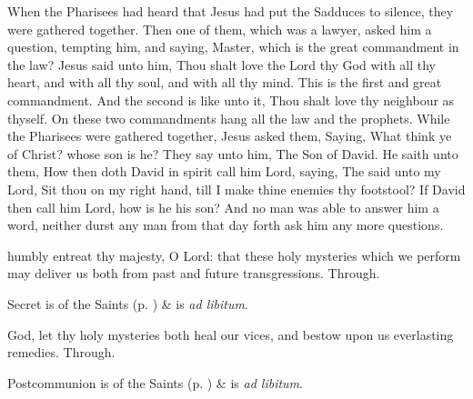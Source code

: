 
 When the Pharisees had heard that Jesus had put the Sadduces to silence, they were gathered together. Then one of them, which was a lawyer, asked him a question, tempting him, and saying, Master, which is the great commandment in the law? Jesus said unto him, Thou shalt love the Lord thy God with all thy heart, and with all thy soul, and with all thy mind. This is the first and great commandment. And the second is like unto it, Thou shalt love thy neighbour as thyself. On these two commandments hang all the law and the prophets. While the Pharisees were gathered together, Jesus asked them, Saying, What think ye of Christ? whose son is he? They say unto him, The Son of David. He saith unto them, How then doth David in spirit call him Lord, saying, The  said unto my Lord, Sit thou on my right hand, till I make thine enemies thy footstool? If David then call him Lord, how is he his son? And no man was able to answer him a word, neither durst any man from that day forth ask him any more questions.


\secret
{} humbly entreat thy majesty, O Lord: that these holy mysteries which we perform may deliver us both from past and future transgressions. Through.
\begin{rubric}
     Secret is of the Saints (p. \pageref{SPSaints}) \&  is \emph{ad libitum}.
\end{rubric}


\postcommunion
{} God, let thy holy mysteries both heal our vices, and bestow upon us everlasting remedies. Through.
\begin{rubric}
     Postcommunion is of the Saints (p. \pageref{SPSaints}) \&  is \emph{ad libitum}.
\end{rubric}

